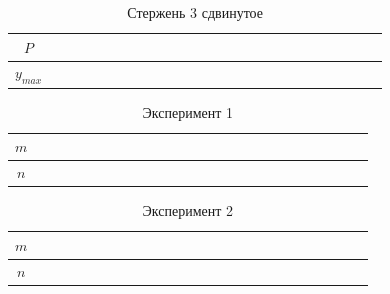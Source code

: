 \documentclass[a4paper,12pt]{article} %
\begin{document}
\begin{table}[!ht]
    \centering
    \begin{tabular}{|c|c|c|c|c|c|c|c|c|c|c}
        \hline
    $ P $   & ~~~ & ~~~ & ~~~ & ~~~ & ~~~ & ~~~ & ~~~ &  ~~~ \\ \hline
    $y_{max}$ & ~~~ & ~~~ & ~~~ & ~~~ & ~~~ & ~~~ & ~~~ &  ~~~\\ \hline
    \end{tabular}
    \caption{Стержень 3 сдвинутое}
\end{table}
\begin{table}[!ht]
    \centering
    \begin{tabular}{|c|c|c|c|c|c|c|c|c|c|c}
        \hline
    $ m $   & ~~~ & ~~~ & ~~~ & ~~~ & ~~~ & ~~~ & ~~~ &  ~~~ \\ \hline
    $n$ & ~~~ & ~~~ & ~~~ & ~~~ & ~~~ & ~~~ & ~~~ &  ~~~\\ \hline
    \end{tabular}
    \caption{Эксперимент 1}
\end{table}
\begin{table}[!ht]
    \centering
    \begin{tabular}{|c|c|c|c|c|c|c|c|c|c|c}
        \hline
    $ m $   & ~~~ & ~~~ & ~~~ & ~~~ & ~~~ & ~~~ & ~~~ &  ~~~ \\ \hline
    $ n $ & ~~~ & ~~~ & ~~~ & ~~~ & ~~~ & ~~~ & ~~~ &  ~~~\\ \hline
    \end{tabular}
    \caption{Эксперимент 2}
\end{table}
\end{document}
